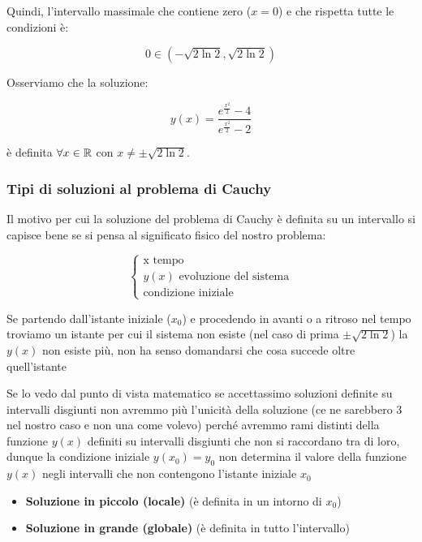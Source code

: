 Quindi, l'intervallo massimale che contiene zero (\(x=0\)) e che rispetta tutte le condizioni è:

\[
    0 \in \left( -\sqrt{2\ln2},\sqrt{2\ln2} \right)
\]

Osserviamo che la soluzione:

\[
    y(x) = \frac{ e ^{\frac{x ^{2}}{2} }-4}{ e ^{\frac{x ^{2}}{2} }-2}
\]

è definita \(\forall x \in \mathbb{R} \) con \(x \neq \pm \sqrt{2\ln2}\).

\filbreak{}

\subsubsection{Tipi di soluzioni al problema di Cauchy}

Il motivo per cui la soluzione del problema di Cauchy è definita su un intervallo si capisce bene se si pensa al significato fisico del nostro problema:

\begin{equation*}
    \begin{cases}
        \text{x tempo}                         \\
        \text{\(y(x)\) evoluzione del sistema} \\
        \text{condizione iniziale}
    \end{cases}
\end{equation*}

Se partendo dall'istante iniziale (\(x_0\)) e procedendo in avanti o a ritroso nel tempo troviamo un istante per cui il sistema non esiste (nel caso di prima \(\pm \sqrt{2\ln2}\)) la \(y(x)\) non esiste più, non ha senso domandarsi che cosa succede oltre quell'istante

Se lo vedo dal punto di vista matematico se accettassimo soluzioni definite su intervalli disgiunti non avremmo più l'unicità della soluzione (ce ne sarebbero 3 nel nostro caso e non una come volevo) perché avremmo rami distinti della funzione \(y(x)\) definiti su intervalli disgiunti che non si raccordano tra di loro, dunque la condizione iniziale \(y(x_0) = y_0\) non determina il valore della funzione \(y(x)\) negli intervalli che non contengono l'istante iniziale \(x_0\)

\begin{itemize}
    \item \textbf{ Soluzione in piccolo (locale) } (è definita in un intorno di \(x_0\))
    \item \textbf{ Soluzione in grande (globale) } (è definita in tutto l'intervallo)
\end{itemize}

